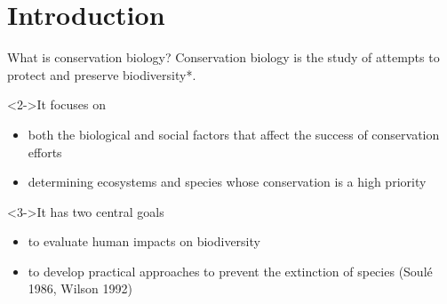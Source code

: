 \section{Introduction}
{
	\begin{frame}[t]{What is conservation biology?}
Conservation biology is the study of attempts to protect and preserve \alert{biodiversity}*.
\begin{block}<2->{It focuses on}
	\begin{itemize}		
		\item<2-> both the biological and social factors that affect the success of conservation efforts
		\item<2-> determining ecosystems and species whose conservation is a high priority
	\end{itemize}
\end{block}

\begin{block}<3->{It has two central goals}
	\begin{itemize}		
		\item<3-> to evaluate human impacts on biodiversity
		\item<3-> to develop practical approaches to prevent the extinction of species\cite{wilson1992diversity} (Soulé 1986, Wilson 1992)
	\end{itemize}
\end{block}

\end{frame}}

